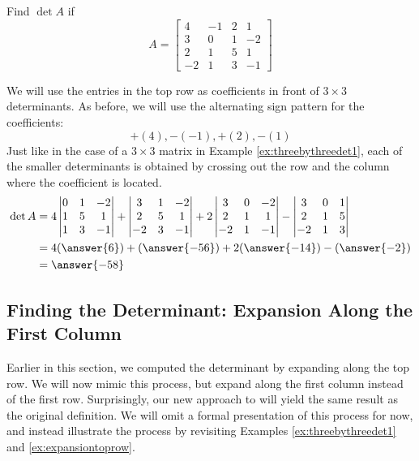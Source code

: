 \documentclass{ximera}
\begin{document}
\begin{example}\label{ex:expansiontoprow}
Find $\det{A}$ if 
$$A=\begin{bmatrix}4&-1&2&1\\3&0&1&-2\\
2&1&5&1\\-2&1&3&-1\end{bmatrix}$$
\begin{explanation}
We will use the entries in the top row as coefficients in front of $3\times 3$ determinants.  As before, we will use the alternating sign pattern for the coefficients:
$$+(4), -(-1), +(2), -(1)$$
Just like in the case of a $3 \times 3$ matrix in Example \ref{ex:threebythreedet1}, each of the smaller determinants is obtained by crossing out the row and the column where the coefficient is located.
\begin{align*}
\det{A}
&=4\begin{vmatrix}0&1&-2\\1&5&1\\1&3&-1\end{vmatrix}+\begin{vmatrix}3&1&-2\\2&5&1\\-2&3&-1\end{vmatrix}+2\begin{vmatrix}3&0&-2\\2&1&1\\-2&1&-1\end{vmatrix}-\begin{vmatrix}3&0&1\\2&1&5\\-2&1&3\end{vmatrix}\\&=4(\answer{6})+(\answer{-56})+2(\answer{-14})-(\answer{-2})\\
&=\answer{-58}
\end{align*}
\end{explanation}
\end{example}

\subsection*{Finding the Determinant: Expansion Along the First Column}
Earlier in this section, we computed the determinant by expanding along the top row.  We will now mimic this process, but expand along the first column instead of the first row.  Surprisingly, our new approach to will yield the same result as the original definition.  We will omit a formal presentation of this process for now, and instead illustrate the process by revisiting Examples \ref{ex:threebythreedet1} and \ref{ex:expansiontoprow}. 
\end{document}
